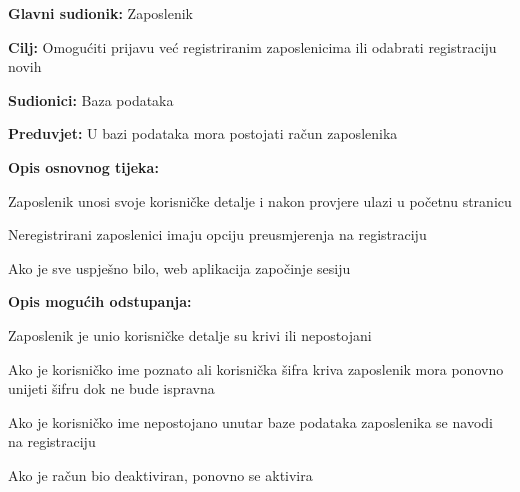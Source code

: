 				\noindent {}
				\begin{packed_item}
					
					\item \textbf{Glavni sudionik:} Zaposlenik
					\item  \textbf{Cilj:} Omogućiti prijavu već registriranim zaposlenicima ili odabrati registraciju novih
					\item  \textbf{Sudionici:} Baza podataka
					\item  \textbf{Preduvjet:} U bazi podataka mora postojati račun zaposlenika
					\item  \textbf{Opis osnovnog tijeka:}
					
					\item[] \begin{packed_enum}
						
						\item Zaposlenik unosi svoje korisničke detalje i nakon provjere ulazi u početnu stranicu 
						\item Neregistrirani zaposlenici imaju opciju preusmjerenja na registraciju
						\item Ako je sve uspješno bilo, web aplikacija započinje sesiju
						
					\end{packed_enum}
					\item  \textbf{Opis mogućih odstupanja:}
					
					\item[] \begin{packed_item}
						
						\item[1.] Zaposlenik je unio korisničke detalje su krivi ili nepostojani
						\item[] \begin{packed_enum}
							
							\item Ako je korisničko ime poznato ali korisnička šifra kriva zaposlenik mora ponovno unijeti šifru dok ne bude ispravna
							\item Ako je korisničko ime nepostojano unutar baze podataka zaposlenika se navodi na registraciju
							
						\end{packed_enum}
						\item[2.] Ako je račun bio deaktiviran, ponovno se aktivira
						
						
					\end{packed_item}			
				\end{packed_item}
			
